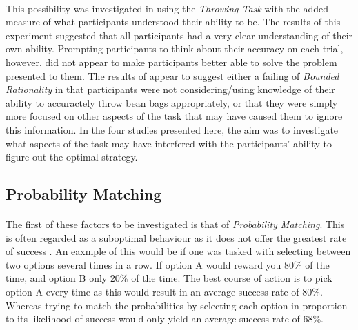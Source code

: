 \documentclass[12pt]{article}
\begin{document}
\paragraph{} This possibility was investigated in \cite{James2017} using the \textit{Throwing Task} with the added measure of what participants understood their ability to be.  The results of this experiment suggested that all participants had a very clear understanding of their own ability. Prompting participants to think about their accuracy on each trial, however, did not appear to make participants better able to solve the problem presented to them. The results of \cite{James2017} appear to suggest either a failing of \textit{Bounded Rationality} in that participants were not considering/using knowledge of their ability to accuractely throw bean bags appropriately, or that they were simply more focused on other aspects of the task that may have caused them to ignore this information. In the four studies presented here, the aim was to investigate what aspects of the task may have interfered with the participants' ability to figure out the optimal strategy. 


\subsection*{Probability Matching}
\paragraph{} The first of these factors to be investigated is that of \textit{Probability Matching}. This is often regarded as a suboptimal behaviour as it does not offer the greatest rate of success \citep{Koehler2010}. An eaxmple of this would be if one was tasked with selecting between two options several times in a row. If option A would reward you 80\% of the time, and option B only 20\% of the time. The best course of action is to pick option A every time as this would result in an average success rate of 80\%. Whereas trying to match the probabilities by selecting each option in proportion to its likelihood of success would only yield an average success rate of 68\%.
\end{document}
